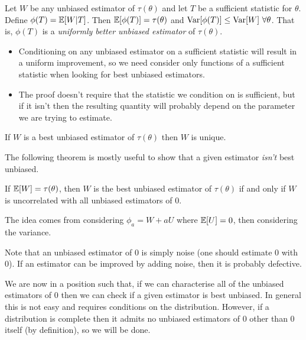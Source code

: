 \begin{theorem}
    Let $W$ be any unbiased estimator of $\tau(\theta)$ and let $T$ be a sufficient statistic for $\theta$. Define $\phi(T) = \mathbb{E}{}[W \vert{} T]$. Then $\mathbb{E}{}[\phi(T)] = \tau(\theta)$ and $\text{Var}{}[\phi(T)] \leq \text{Var}{}[W] \,\, \forall \theta$. That is, $\phi(T)$ is a \emph{uniformly better unbiased estimator} of $\tau(\theta)$.
\end{theorem}

\begin{remark}
    \mbox{}
    \begin{itemize}
        \item Conditioning on any unbiased estimator on a sufficient statistic will result in a uniform improvement, so we need consider only functions of a sufficient statistic when looking for best unbiased estimators.
        \item The proof doesn't require that the statistic we condition on is sufficient, but if it isn't then the resulting quantity will probably depend on the parameter we are trying to estimate.
    \end{itemize}
\end{remark}

\begin{theorem}
    If $W$ is a best unbiased estimator of $\tau(\theta)$ then $W$ is unique.
\end{theorem}

The following theorem is mostly useful to show that a given estimator \emph{isn't} best unbiased.

\begin{theorem}
    If $\mathbb{E}{}[W] = \tau(\theta)$, then $W$ is the best unbiased estimator of $\tau(\theta)$ if and only if $W$ is uncorrelated with all unbiased estimators of 0.
\end{theorem}

The idea comes from considering $\phi_a = W + aU$ where $\mathbb{E}{}[U] = 0$, then considering the variance.

\begin{remark}
    Note that an unbiased estimator of 0 is simply noise (one should estimate 0 with 0). If an estimator can be improved by adding noise, then it is probably defective.
\end{remark}

We are now in a position such that, if we can characterise all of the unbiased estimators of 0 then we can check if a given estimator is best unbiased. In general this is not easy and requires conditions on the distribution. However, if a distribution is complete then it admits no unbiased estimators of 0 other than 0 itself (by definition), so we will be done.\\

